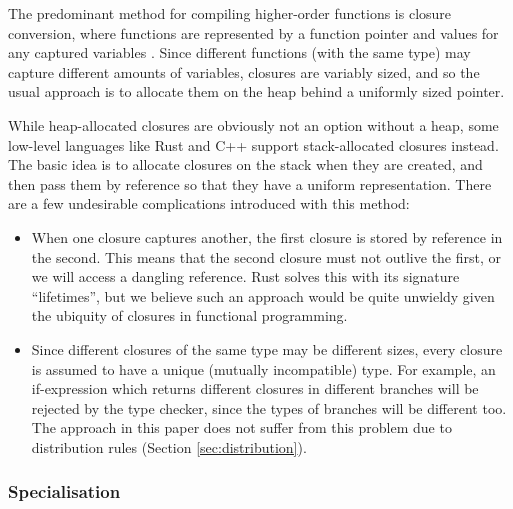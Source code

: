 \documentclass[runningheads]{llncs}
\begin{document}
The predominant method for compiling higher-order functions is closure conversion, where functions are represented by a function pointer and values for any captured variables \cite{minamide1996typed}. Since different functions (with the same type) may capture different amounts of variables, closures are variably sized, and so the usual approach is to allocate them on the heap behind a uniformly sized pointer.

While heap-allocated closures are obviously not an option without a heap, some low-level languages like Rust and C++ support stack-allocated closures instead. The basic idea is to allocate closures on the stack when they are created, and then pass them by reference so that they have a uniform representation. There are a few undesirable complications introduced with this method:

\begin{itemize}
  \item When one closure captures another, the first closure is stored by reference in the second. This means that the second closure must not outlive the first, or we will access a dangling reference. Rust solves this with its signature ``lifetimes'', but we believe such an approach would be quite unwieldy given the ubiquity of closures in functional programming.
  \item Since different closures of the same type may be different sizes, every closure is assumed to have a unique (mutually incompatible) type. For example, an if-expression which returns different closures in different branches will be rejected by the type checker, since the types of branches will be different too. The approach in this paper does not suffer from this problem due to distribution rules (Section \ref{sec:distribution}).
\end{itemize}



\subsubsection{Specialisation} \label{sec:specialisation}
\end{document}
